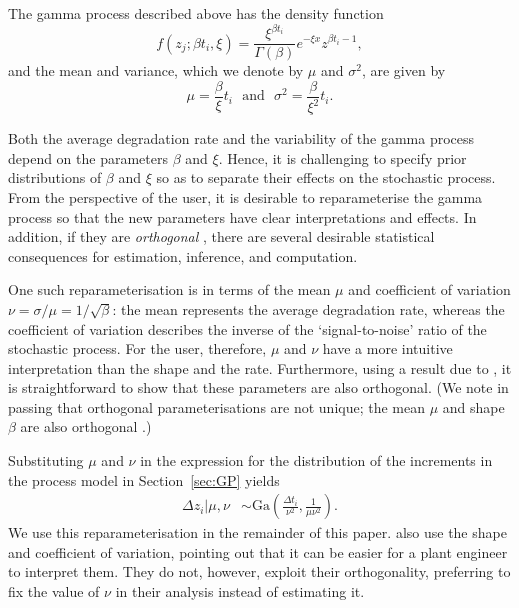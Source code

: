 \documentclass{article}
\begin{document}
The gamma process described above has the density function
\begin{equation}
    f(z_j; \beta t_i, \xi) = \frac{\xi^{\beta t_i}}{\Gamma(\beta)} e^{-\xi x} z^{\beta t_i - 1}, \label{eq:GamDist}
\end{equation}
and the mean and variance, which we denote by $\mu$ and $\sigma^2$, are given by
\begin{equation}
    \mu = \frac{\beta}{\xi}t_i \,\,\,\,\mbox{and}\,\,\,\,\sigma^2 = \frac{\beta}{\xi^2}t_i. \label{eq:GamProp}
\end{equation}

Both the average degradation rate and the variability of the gamma process depend on the parameters $\beta$ and $\xi$. Hence, it is challenging to specify prior distributions of $\beta$ and $\xi$ so as to separate their effects on the stochastic process. From the perspective of the user, it is desirable to reparameterise the gamma process so that the new parameters have clear interpretations and effects. In addition, if they are \emph{orthogonal} \citep{cox_reid_1987}, there are several desirable statistical consequences for estimation, inference, and computation.

One such reparameterisation is in terms of the mean $\mu$ and coefficient of variation $\nu = \sigma/\mu = 1/\sqrt{\beta}$: the mean represents the average degradation rate, whereas the coefficient of variation describes the inverse of the `signal-to-noise' ratio of the stochastic process. For the user, therefore, $\mu$ and $\nu$ have a more intuitive interpretation than the shape and the rate. Furthermore, using a result due to \citet{huzurbazar_1956}, it is straightforward to show that these parameters are also orthogonal. (We note in passing that orthogonal parameterisations are not unique; the mean $\mu$ and shape $\beta$ are also orthogonal \citep{huzurbazar_1956}.)

Substituting $\mu$ and $\nu$ in the expression for the distribution of the increments in the process model in Section~\ref{sec:GP} yields
\begin{align} \label{eq:GP_stationary_reparam}
    \Delta z_i|\mu, \nu & \sim \mbox{Ga} \left( \frac{\Delta t_i}{\nu^2}, \frac{1}{\mu \nu^2} \right).
\end{align}
We use this reparameterisation in the remainder of this paper. \citet{kallen_optimal_2005} also use the shape and coefficient of variation, pointing out that it can be easier for a plant engineer to interpret them. They do not, however, exploit their orthogonality, preferring to fix the value of $\nu$ in their analysis instead of estimating it.
\end{document}
